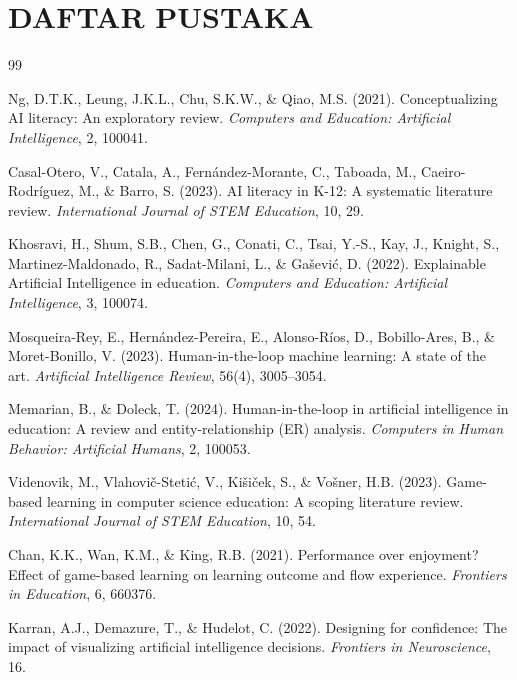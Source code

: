 \documentclass[12pt,a4paper,oneside,openany]{report}
\begin{document}
\chapter*{DAFTAR PUSTAKA}

\begin{thebibliography}{99}

Ng, D.T.K., Leung, J.K.L., Chu, S.K.W., \& Qiao, M.S. (2021). Conceptualizing AI literacy: An exploratory review. \textit{Computers and Education: Artificial Intelligence}, 2, 100041.

Casal-Otero, V., Catala, A., Fern\'andez-Morante, C., Taboada, M., Caeiro-Rodr\'iguez, M., \& Barro, S. (2023). AI literacy in K-12: A systematic literature review. \textit{International Journal of STEM Education}, 10, 29.

Khosravi, H., Shum, S.B., Chen, G., Conati, C., Tsai, Y.-S., Kay, J., Knight, S., Martinez-Maldonado, R., Sadat-Milani, L., \& Ga\v{s}evi\'c, D. (2022). Explainable Artificial Intelligence in education. \textit{Computers and Education: Artificial Intelligence}, 3, 100074.

Mosqueira-Rey, E., Hern\'andez-Pereira, E., Alonso-R\'ios, D., Bobillo-Ares, B., \& Moret-Bonillo, V. (2023). Human-in-the-loop machine learning: A state of the art. \textit{Artificial Intelligence Review}, 56(4), 3005--3054.

Memarian, B., \& Doleck, T. (2024). Human-in-the-loop in artificial intelligence in education: A review and entity-relationship (ER) analysis. \textit{Computers in Human Behavior: Artificial Humans}, 2, 100053.

Videnovik, M., Vlahovi\v{c}-Steti\'c, V., Kišiček, S., \& Vošner, H.B. (2023). Game-based learning in computer science education: A scoping literature review. \textit{International Journal of STEM Education}, 10, 54.

Chan, K.K., Wan, K.M., \& King, R.B. (2021). Performance over enjoyment? Effect of game-based learning on learning outcome and flow experience. \textit{Frontiers in Education}, 6, 660376.

Karran, A.J., Demazure, T., \& Hudelot, C. (2022). Designing for confidence: The impact of visualizing artificial intelligence decisions. \textit{Frontiers in Neuroscience}, 16.


\end{thebibliography}
\end{document}
